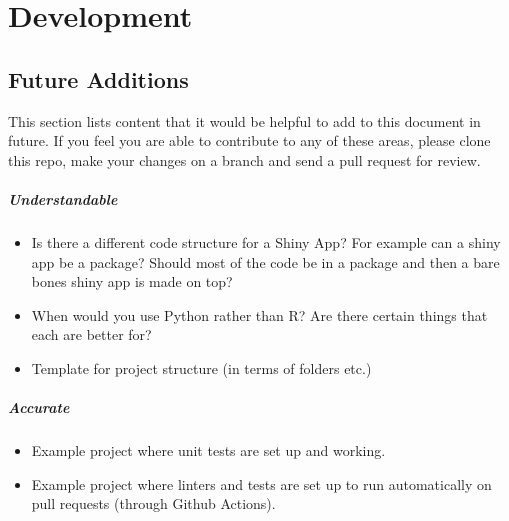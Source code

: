\documentclass[]{book}
\providecommand{\tightlist}{%
  \setlength{\itemsep}{0pt}\setlength{\parskip}{0pt}}
\begin{document}
\hypertarget{dev}{%
\part{Development}\label{dev}}

\hypertarget{futureadd}{%
\chapter{Future Additions}\label{futureadd}}

This section lists content that it would be helpful to add to this document in future. If you feel you are able to contribute to any of these areas, please clone this repo, make your changes on a branch and send a pull request for review.

\hypertarget{understandable}{%
\subsubsection*{Understandable}\label{understandable}}

\begin{itemize}
\tightlist
\item
  Is there a different code structure for a Shiny App?
  For example can a shiny app be a package? Should most of the code be in a package and then a bare bones shiny app is made on top?\\
\item
  When would you use Python rather than R? Are there certain things that each are better for?\\
\item
  Template for project structure (in terms of folders etc.)
\end{itemize}

\hypertarget{accurate-1}{%
\subsubsection*{Accurate}\label{accurate-1}}

\begin{itemize}
\tightlist
\item
  Example project where unit tests are set up and working.\\
\item
  Example project where linters and tests are set up to run automatically on pull requests (through Github Actions).
\end{itemize}
\end{document}
